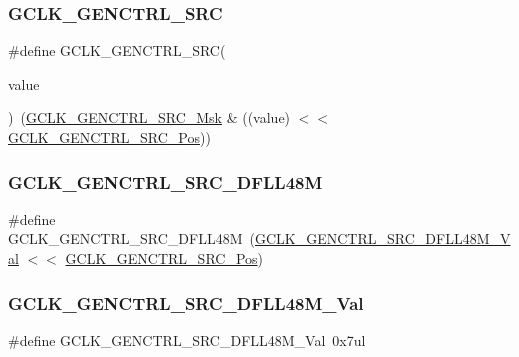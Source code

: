 \subsubsection{\texorpdfstring{GCLK\_GENCTRL\_SRC}{GCLK\_GENCTRL\_SRC}}
{\footnotesize\ttfamily \#define G\+C\+L\+K\+\_\+\+G\+E\+N\+C\+T\+R\+L\+\_\+\+S\+RC(\begin{DoxyParamCaption}\item[{}]{value }\end{DoxyParamCaption})~(\mbox{\hyperlink{group___s_a_m_d21___g_c_l_k_ga1341d6ea0cb6d9dc6bb42710ac632eed}{G\+C\+L\+K\+\_\+\+G\+E\+N\+C\+T\+R\+L\+\_\+\+S\+R\+C\+\_\+\+Msk}} \& ((value) $<$$<$ \mbox{\hyperlink{group___s_a_m_d21___g_c_l_k_ga3ca6fb0d36a0f1194282d2517b22965f}{G\+C\+L\+K\+\_\+\+G\+E\+N\+C\+T\+R\+L\+\_\+\+S\+R\+C\+\_\+\+Pos}}))}

\mbox{\label{group___s_a_m_d21___g_c_l_k_gaa23918b1d8f76e45db3cbec26eb70973}} 
\subsubsection{\texorpdfstring{GCLK\_GENCTRL\_SRC\_DFLL48M}{GCLK\_GENCTRL\_SRC\_DFLL48M}}
{\footnotesize\ttfamily \#define G\+C\+L\+K\+\_\+\+G\+E\+N\+C\+T\+R\+L\+\_\+\+S\+R\+C\+\_\+\+D\+F\+L\+L48M~(\mbox{\hyperlink{group___s_a_m_d21___g_c_l_k_ga70357963bac751c47a0b097568f1ec34}{G\+C\+L\+K\+\_\+\+G\+E\+N\+C\+T\+R\+L\+\_\+\+S\+R\+C\+\_\+\+D\+F\+L\+L48\+M\+\_\+\+Val}}  $<$$<$ \mbox{\hyperlink{group___s_a_m_d21___g_c_l_k_ga3ca6fb0d36a0f1194282d2517b22965f}{G\+C\+L\+K\+\_\+\+G\+E\+N\+C\+T\+R\+L\+\_\+\+S\+R\+C\+\_\+\+Pos}})}

\mbox{\label{group___s_a_m_d21___g_c_l_k_ga70357963bac751c47a0b097568f1ec34}} 
\subsubsection{\texorpdfstring{GCLK\_GENCTRL\_SRC\_DFLL48M\_Val}{GCLK\_GENCTRL\_SRC\_DFLL48M\_Val}}
{\footnotesize\ttfamily \#define G\+C\+L\+K\+\_\+\+G\+E\+N\+C\+T\+R\+L\+\_\+\+S\+R\+C\+\_\+\+D\+F\+L\+L48\+M\+\_\+\+Val~0x7ul}



